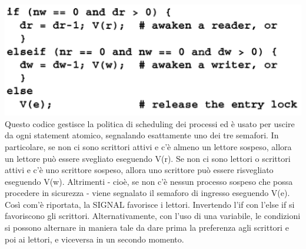 \documentclass[10pt,a4paper]{book}
\begin{document}
\includegraphics[scale=0.41]{img/signal.png} \\
Questo codice gestisce la politica di scheduling dei processi ed è usato per uscire da ogni statement atomico, segnalando esattamente uno dei tre semafori. In particolare, se non ci sono scrittori attivi e c'è almeno un lettore sospeso, allora un lettore può essere svegliato eseguendo V(r). Se non ci sono lettori o scrittori attivi e c'è uno scrittore sospeso, allora uno scrittore può essere risvegliato eseguendo V(w). Altrimenti - cioè, se non c'è nessun processo sospeso che possa procedere in sicurezza - viene segnalato il semaforo di ingresso eseguendo V(e).
Così com'è riportata, la SIGNAL favorisce i lettori. Invertendo l'if con l'else if si favoriscono gli scrittori. Alternativamente, con l'uso di una variabile, le condizioni si possono alternare in maniera tale da dare prima la preferenza agli scrittori e poi ai lettori, e viceversa in un secondo momento.
\end{document}
